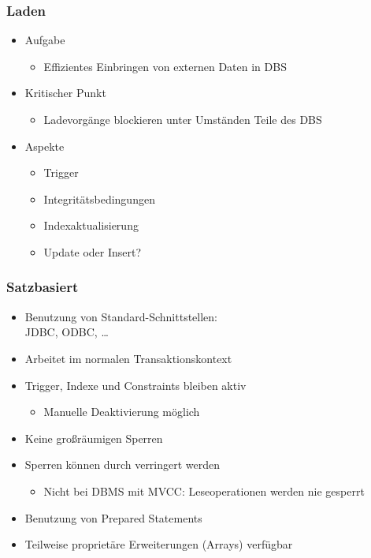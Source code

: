 \begin{frame}

\frametitle{Laden}

\begin{itemize}
\item Aufgabe
\begin{itemize}
\item Effizientes Einbringen von externen Daten in DBS
\end{itemize}
\item Kritischer Punkt
\begin{itemize}
\item Ladevorgänge blockieren unter Umständen Teile des DBS
\end{itemize}
\item Aspekte
\begin{itemize}
\item Trigger
\item Integritätsbedingungen
\item Indexaktualisierung
\item Update oder Insert?
\end{itemize}
\end{itemize}

\end{frame}


\begin{frame}

\frametitle{Satzbasiert}

\begin{itemize}
\item Benutzung von Standard-Schnittstellen: \\JDBC, ODBC, \dots
\item Arbeitet im normalen Transaktionskontext
\item Trigger, Indexe und Constraints bleiben aktiv
\begin{itemize}
\item Manuelle Deaktivierung möglich
\end{itemize}
\item Keine großräumigen Sperren
\item Sperren können durch  verringert werden
\begin{itemize}
\item Nicht bei DBMS mit MVCC: Leseoperationen werden nie gesperrt 
\end{itemize}
\item Benutzung von Prepared Statements
\item Teilweise proprietäre Erweiterungen (Arrays) verfügbar
\end{itemize}

\end{frame}

